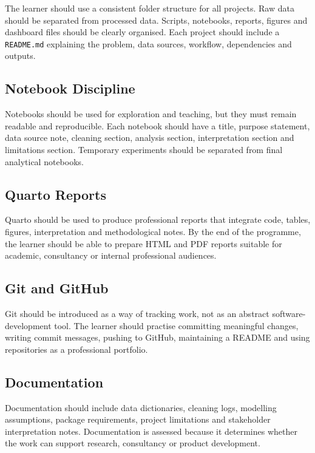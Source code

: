 \documentclass[
  a4paper,
]{article}
\begin{document}
The learner should use a consistent folder structure for all projects.
Raw data should be separated from processed data. Scripts, notebooks,
reports, figures and dashboard files should be clearly organised. Each
project should include a \texttt{README.md} explaining the problem, data
sources, workflow, dependencies and outputs.

\subsection{Notebook Discipline}\label{notebook-discipline}

Notebooks should be used for exploration and teaching, but they must
remain readable and reproducible. Each notebook should have a title,
purpose statement, data source note, cleaning section, analysis section,
interpretation section and limitations section. Temporary experiments
should be separated from final analytical notebooks.

\subsection{Quarto Reports}\label{quarto-reports}

Quarto should be used to produce professional reports that integrate
code, tables, figures, interpretation and methodological notes. By the
end of the programme, the learner should be able to prepare HTML and PDF
reports suitable for academic, consultancy or internal professional
audiences.

\subsection{Git and GitHub}\label{git-and-github}

Git should be introduced as a way of tracking work, not as an abstract
software-development tool. The learner should practise committing
meaningful changes, writing commit messages, pushing to GitHub,
maintaining a README and using repositories as a professional portfolio.

\subsection{Documentation}\label{documentation}

Documentation should include data dictionaries, cleaning logs, modelling
assumptions, package requirements, project limitations and stakeholder
interpretation notes. Documentation is assessed because it determines
whether the work can support research, consultancy or product
development.
\end{document}
